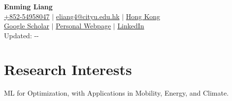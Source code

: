 \documentclass[letterpaper,11pt]{article}
\renewcommand{\today}{\number\year-\number\month-\number\day }
\begin{document}

\begin{center}
    \textbf{\Huge Enming Liang} \\ 
    \vspace{5pt}
    \faMobile \hspace{.5pt} \href{tel:85254958047}{+852-54958047}
    $|$
    \faAt \hspace{.5pt} \href{eliang4@cityu.edu.hk}{eliang4@cityu.edu.hk}
    $|$
    \faMapMarker \hspace{.5pt} \href{d}{Hong Kong} 
\\   \vspace{5pt}
    \faGoogle \hspace{.5pt} \href{https://scholar.google.com.sg/citations?user=Todfu6AAAAAJ&hl=zh-CN}{Google Scholar}
    $|$
    \faGithub \hspace{.5pt} \href{https://emliang.github.io/}{Personal Webpage}
    $|$
    \faLinkedinSquare \hspace{.5pt} \href{https://www.linkedin.com/in/enming-liang-95b5b216a/}{LinkedIn}
\\    \vspace{5pt}
     Updated: \today
\end{center}





\section{\LARGE Research Interests}
  \vspace{5pt}
    {\Large \centering ML for Optimization, 
    with Applications in Mobility, Energy, and Climate.\\}{}
  \vspace{5pt}
  
    
\end{document}
